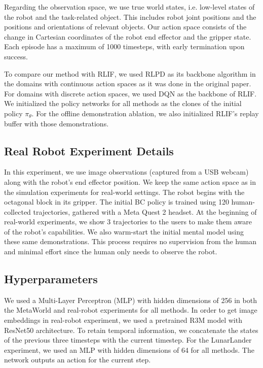 Regarding the observation space, we use true world states, i.e. low-level states of the robot and the task-related object. This includes robot joint positions and the positions and orientations of relevant objects. Our action space consists of the change in Cartesian coordinates of the robot end effector and the gripper state. Each episode has a maximum of 1000 timesteps, with early termination upon success.

To compare our method with RLIF, we used RLPD as its backbone algorithm in the domains with continuous action spaces as it was done in the original paper. For domains with discrete action spaces, we used DQN as the backbone of RLIF. We initialized the policy networks for all methods as the clones of the initial policy $\pi_\theta$. For the offline demonstration ablation, we also initialized RLIF's replay buffer with those demonstrations.

\subsection{Real Robot Experiment Details}
In this experiment, we use image observations (captured from a USB webcam) along with the robot's end effector position. We keep the same action space as in the simulation experiments for real-world settings. The robot begins with the octagonal block in its gripper. The initial BC policy is trained using 120 human-collected trajectories, gathered with a Meta Quest 2 headset. At the beginning of real-world experiments, we show 3 trajectories to the users to make them aware of the robot's capabilities. We also warm-start the initial mental model using these same demonstrations. This process requires no supervision from the human and minimal effort since the human only needs to observe the robot.

\subsection{Hyperparameters}
We used a Multi-Layer Perceptron (MLP) with hidden dimensions of 256 in both the MetaWorld and real-robot experiments for all methods. In order to get image embeddings in real-robot experiment, we used a pretrained R3M model with ResNet50 architecture. To retain temporal information, we concatenate the states of the previous three timesteps with the current timestep. For the LunarLander experiment, we used an MLP with hidden dimensions of 64 for all methods. The network outputs an action for the current step.

